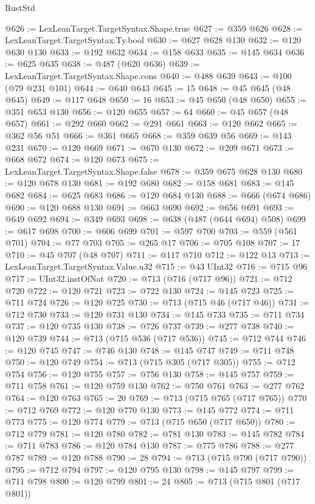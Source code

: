\begin{lexlean}{RustStd}
\begin{coremodule}
{\begin{coremodule}
{{{{{{{{{{{{{{{{{{{{{{{{{{{{{{{{{{{{{{{{{{{{{{{{{{{{{{{{{{{{@626 := LexLeanTarget.TargetSyntax.Shape.true
@627 := @359 @626
@628 := LexLeanTarget.TargetSyntax.Ty.bool
@630 := @627 @628 @130
@632 := @120 @630 @130
@633 := @192 @632
@634 := @158 @633
@635 := @145 @634
@636 := @625 @635
@638 := @487 (@620 @636)
@639 := LexLeanTarget.TargetSyntax.Shape.cons
@640 := @488 @639
@643 := @100 (@79 @231 @101)
@644 := @640 @643
@645 := 15
@648 := @45 @645 (@48 @645)
@649 := @117 @648
@650 := 16
@653 := @45 @650 (@48 @650)
@655 := @351 @653 @130
@656 := @120 @655
@657 := 64
@660 := @45 @657 (@48 @657)
@661 := @292 @660
@662 := @291 @661
@663 := @120 @662
@665 := @362 @56 @51
@666 := @361 @665
@668 := @359 @639 @56
@669 := @143 @231
@670 := @120 @669
@671 := @670 @130
@672 := @209 @671
@673 := @668 @672
@674 := @120 @673
@675 := LexLeanTarget.TargetSyntax.Shape.false
@678 := @359 @675 @628 @130
@680 := @120 @678 @130
@681 := @192 @680
@682 := @158 @681
@683 := @145 @682
@684 := @625 @683
@686 := @120 @684 @130
@688 := @666 (@674 @686)
@690 := @120 @688 @130
@691 := @663 @690
@692 := @656 @691
@693 := @649 @692
@694 := @349 @693
@698 := @638 (@487 (@644 @694) @508)
@699 := @617 @698
@700 := @606 @699
@701 := @597 @700
@703 := @559 (@561 @701)
@704 := @77 @703
@705 := @265 @17
@706 := @705 @108
@707 := 17
@710 := @45 @707 (@48 @707)
@711 := @117 @710
@712 := @122 @13
@713 := LexLeanTarget.TargetSyntax.Value.u32
@715 := @43 UInt32
@716 := @715 @96
@717 := UInt32.instOfNat
@720 := @713 (@716 (@717 @96))
@721 := @712 @720
@722 := @120 @721
@723 := @722 @130
@724 := @145 @723
@725 := @711 @724
@726 := @120 @725
@730 := @713 (@715 @46 (@717 @46))
@731 := @712 @730
@733 := @120 @731 @130
@734 := @145 @733
@735 := @711 @734
@737 := @120 @735 @130
@738 := @726 @737
@739 := @277 @738
@740 := @120 @739
@744 := @713 (@715 @536 (@717 @536))
@745 := @712 @744
@746 := @120 @745
@747 := @746 @130
@748 := @145 @747
@749 := @711 @748
@750 := @120 @749
@754 := @713 (@715 @305 (@717 @305))
@755 := @712 @754
@756 := @120 @755
@757 := @756 @130
@758 := @145 @757
@759 := @711 @758
@761 := @120 @759 @130
@762 := @750 @761
@763 := @277 @762
@764 := @120 @763
@765 := 20
@769 := @713 (@715 @765 (@717 @765))
@770 := @712 @769
@772 := @120 @770 @130
@773 := @145 @772
@774 := @711 @773
@775 := @120 @774
@779 := @713 (@715 @650 (@717 @650))
@780 := @712 @779
@781 := @120 @780
@782 := @781 @130
@783 := @145 @782
@784 := @711 @783
@786 := @120 @784 @130
@787 := @775 @786
@788 := @277 @787
@789 := @120 @788
@790 := 28
@794 := @713 (@715 @790 (@717 @790))
@795 := @712 @794
@797 := @120 @795 @130
@798 := @145 @797
@799 := @711 @798
@800 := @120 @799
@801 := 24
@805 := @713 (@715 @801 (@717 @801))
}}}}}}}}}}}}}}}}}}}}}}}}}}}}}}}}}}}}}}}}}}}}}}}}}}}}}}}}}}}}
\end{coremodule}}
\end{coremodule}
\end{lexlean}

